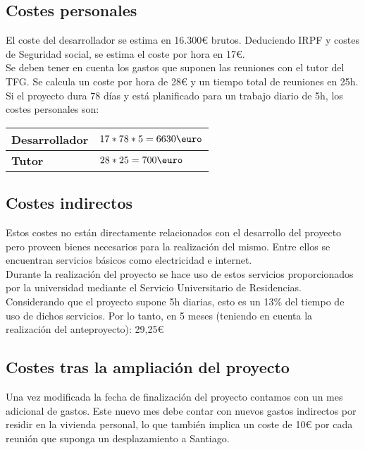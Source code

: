 \subsection{Costes personales}

El coste del desarrollador se estima en 16.300{\euro} brutos. Deduciendo IRPF y costes de Seguridad social, se estima el coste por hora en 17{\euro}.\\

Se deben tener en cuenta los gastos que suponen las reuniones con el tutor del TFG. Se calcula un coste por hora de 28{\euro} y un tiempo total de reuniones en 25h.\\

Si el proyecto dura 78 días y está planificado para un trabajo diario de 5h, los costes personales son:\\

\begin{tabularx}{\linewidth}{|p{3cm}|X|}
    \hline
    \textbf{Desarrollador} & $17*78*5=6630\mbox{\euro}$ \tabularnewline
    \hline
    \textbf{Tutor} & $28*25=700\mbox{\euro}$ \tabularnewline
    \hline
\end{tabularx}

\subsection{Costes indirectos}

Estos costes no están directamente relacionados con el desarrollo del proyecto pero proveen bienes necesarios para la realización del mismo. Entre ellos se encuentran servicios básicos como electricidad e internet.\\

Durante la realización del proyecto se hace uso de estos servicios proporcionados por la universidad mediante el Servicio Universitario de Residencias. \\

Considerando que el proyecto supone 5h diarias, esto es un 13\% del tiempo de uso de dichos servicios. Por lo tanto, en 5 meses (teniendo en cuenta la realización del anteproyecto): 29,25{\euro}

\subsection{Costes tras la ampliación del proyecto}

Una vez modificada la fecha de finalización del proyecto contamos con un mes adicional de gastos. Este nuevo mes debe contar con nuevos gastos indirectos por residir en la vivienda personal, lo que también implica un coste de 10{\euro} por cada reunión que suponga un desplazamiento a Santiago.\\

